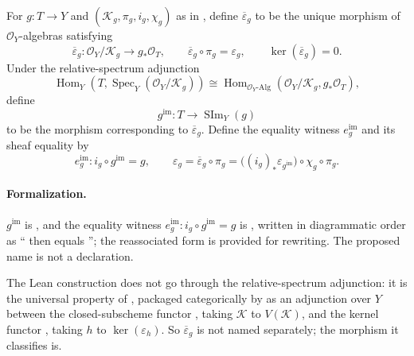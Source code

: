\begin{definition}
  \label{def:nagata-scheme-image-factor}
  \leanok

  For $g\colon T\to Y$ and
  $(\mathcal K_g,\pi_g,i_g,\chi_g)$ as in
  , define
  $\overline\varepsilon_g$ to be the unique morphism of
  $\mathcal O_Y$-algebras satisfying
  \[
    \overline\varepsilon_g\colon
      \mathcal O_Y/\mathcal K_g\longrightarrow g_*\mathcal O_T,
    \qquad
    \overline\varepsilon_g\circ\pi_g=\varepsilon_g,
    \qquad
    \ker(\overline\varepsilon_g)=0.
  \]
  Under the relative-spectrum adjunction
  \[
    \operatorname{Hom}_Y
      \!\left(T,\operatorname{Spec}_Y(\mathcal O_Y/\mathcal K_g)\right)
      \cong
    \operatorname{Hom}_{\mathcal O_Y\text{-Alg}}
      \!\left(\mathcal O_Y/\mathcal K_g,g_*\mathcal O_T\right),
  \]
  define
  \[
    g^{\mathrm{im}}\colon T\longrightarrow\operatorname{SIm}_Y(g)
  \]
  to be the morphism corresponding to $\overline\varepsilon_g$.  Define the
  equality witness $e_g^{\mathrm{im}}$ and its sheaf equality by
  \[
    e_g^{\mathrm{im}}\colon i_g\circ g^{\mathrm{im}}=g,
    \qquad
    \varepsilon_g
      =\overline\varepsilon_g\circ\pi_g
      =\bigl((i_g)_*\varepsilon_{g^{\mathrm{im}}}\bigr)
         \circ\chi_g\circ\pi_g.
  \]

  \paragraph{Formalization.}
  $g^{\mathrm{im}}$ is \texttt{}, and the
  equality witness $e_g^{\mathrm{im}}\colon i_g\circ g^{\mathrm{im}}=g$ is
  \texttt{}, written in diagrammatic order as
  ``\texttt{} then \texttt{} equals
  \texttt{}''; the reassociated form
  \texttt{} is provided for rewriting.  The proposed name
  \texttt{} is not a declaration.

  The Lean construction does not go through the relative-spectrum adjunction: it is the
  universal property of \texttt{}, packaged
  categorically by \texttt{} as an adjunction over $Y$
  between the closed-subscheme functor
  \texttt{}, taking
  $\mathcal K$ to $V(\mathcal K)$, and the kernel functor
  \texttt{}, taking $h$ to $\ker(\varepsilon_h)$.  So
  $\overline\varepsilon_g$ is not named separately; the morphism it classifies is.
\end{definition}


